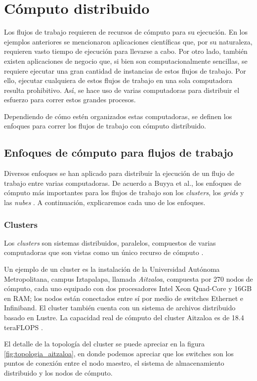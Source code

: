 \chapter{Cómputo distribuido}
Los flujos de trabajo requieren de recursos de cómputo para su ejecución. En los ejemplos anteriores se mencionaron aplicaciones científicas que, por su naturaleza, requieren vasto tiempo de ejecución para llevarse a cabo. Por otro lado, también existen aplicaciones de negocio que, si bien son computacionalmente sencillas, se requiere ejecutar una gran cantidad de instancias de estos flujos de trabajo. Por ello, ejecutar cualquiera de estos flujos de trabajo en una sola computadora resulta prohibitivo. Así, se hace uso de varias computadoras para distribuir el esfuerzo para correr estos grandes procesos.

Dependiendo de cómo estén organizados estas computadoras, se definen los enfoques para correr los flujos de trabajo con cómputo distribuido.

\section{Enfoques de cómputo para flujos de trabajo}
Diversos enfoques se han aplicado para distribuir la ejecución de un flujo de trabajo entre varias computadoras.  De acuerdo a Buyya et al., los enfoques de cómputo más importantes para los flujos de trabajo son los \emph{clusters}, los \emph{grids} y las \emph{nubes} \cite{buyya2009cloud}. A continuación, explicaremos cada uno de los enfoques.

\subsection{Clusters}
Los \emph{clusters} son sistemas distribuidos, paralelos, compuestos de varias computadoras que son vistas como un único recurso de cómputo \cite{buyya2009cloud}. 

Un ejemplo de un cluster es la instalación de la Universidad Autónoma Metropolitana, campus Iztapalapa, llamada \emph{Aitzaloa}, compuesta por 270 nodos de cómputo, cada uno equipado con dos procesadores Intel Xeon Quad-Core y 16GB en RAM; los nodos están conectados entre sí por medio de switches Ethernet e Infiniband. El cluster también cuenta con un sistema de archivos distribuido basado en Lustre. La capacidad real de cómputo del cluster Aitzaloa es de 18.4 teraFLOPS \cite{uamz2013tizaloa}.

El detalle de la topología del cluster se puede apreciar en la figura \ref{fig:topologia_aitzaloa}, en donde podemos apreciar que los switches son los puntos de conexión entre el nodo maestro, el sistema de almacenamiento distribuido y los nodos de cómputo.

